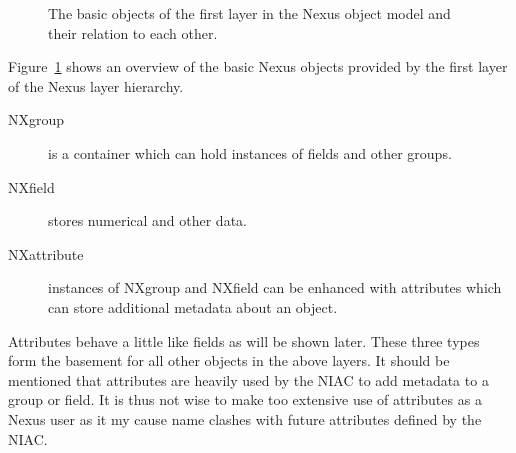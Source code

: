 \begin{figure}[tb]
    \centering
    \begin{minipage}[c]{0.6\linewidth}
    \centering
    \end{minipage}
    \hfill
    \begin{minipage}[c]{0.39\linewidth}
    \caption{{\small The basic objects of the first layer in the Nexus object
    model and their relation to each other.}}
    \label{fig:nxintro:layer1}
    \end{minipage}
\end{figure}

Figure~\ref{fig:nxintro:layer1} shows an overview of the basic Nexus objects
provided by the first layer of the Nexus layer hierarchy. 
\begin{description}
    \item[NXgroup] is a container which can hold instances of fields and other
        groups.
    \item[NXfield] stores numerical and other data.
    \item[NXattribute] instances of NXgroup and NXfield can be enhanced with
        attributes which can store additional metadata about an object.
\end{description}
Attributes behave a little like fields as will be shown later. These three types
form the basement for all other objects in the above layers. 
It should be mentioned that attributes are heavily used by the NIAC to add
metadata to a group or field. It is thus not wise to make too extensive use of
attributes as a Nexus user as it my cause name clashes with future attributes
defined by the NIAC.

